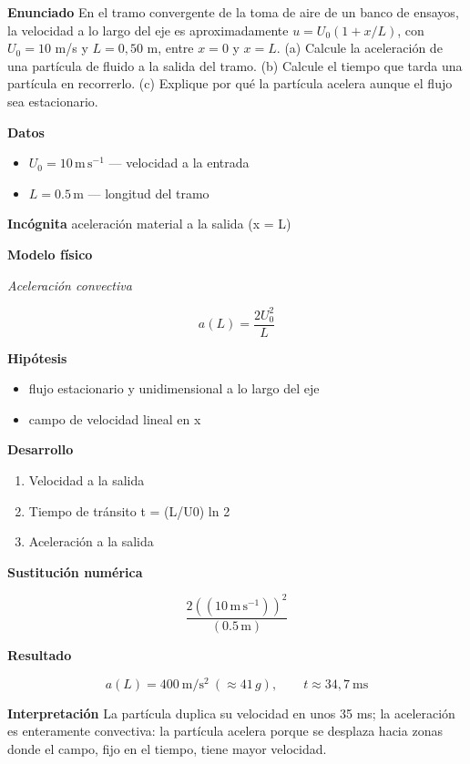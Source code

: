 \documentclass[10pt,openany]{book}
\begin{document}
\begin{tcolorbox}[title={Problema resuelto}, studiumworked, breakable]

\noindent\textbf{Enunciado}
En el tramo convergente de la toma de aire de un banco de ensayos, la velocidad a lo largo del eje es aproximadamente \(u = U_0(1 + x/L)\), con \(U_0 = 10\) m/s y \(L = 0{,}50\) m, entre \(x = 0\) y \(x = L\). (a) Calcule la aceleración de una partícula de fluido a la salida del tramo. (b) Calcule el tiempo que tarda una partícula en recorrerlo. (c) Explique por qué la partícula acelera aunque el flujo sea estacionario.

\noindent\textbf{Datos}
\begin{itemize}
\item $U_{0} = 10\,\mathrm{m}\,\mathrm{s}^{-1}$ — velocidad a la entrada
\item $L = 0.5\,\mathrm{m}$ — longitud del tramo
\end{itemize}

\noindent\textbf{Incógnita}
aceleración material a la salida (x = L)

\noindent\textbf{Modelo físico}

\noindent\textit{Aceleración convectiva}

\[
a(L) = \frac{2 U_0^{2}}{L}
\]

\noindent\textbf{Hipótesis}
\begin{itemize}
\item flujo estacionario y unidimensional a lo largo del eje
\item campo de velocidad lineal en x
\end{itemize}

\noindent\textbf{Desarrollo}
\begin{enumerate}
\item
Velocidad a la salida
\item
Tiempo de tránsito t = (L/U0) ln 2
\item
Aceleración a la salida
\end{enumerate}

\noindent\textbf{Sustitución numérica}

\[
\frac{2 \left(\left(10\,\mathrm{m}\,\mathrm{s}^{-1}\right)\right)^{2}}{\left(0.5\,\mathrm{m}\right)}
\]

\noindent\textbf{Resultado}

\[
a(L) = 400\ \mathrm{m/s^{2}}\ (\approx 41\,g),\qquad t \approx 34{,}7\ \mathrm{ms}
\]

\noindent\textbf{Interpretación}
La partícula duplica su velocidad en unos 35 ms; la aceleración es enteramente convectiva: la partícula acelera porque se desplaza hacia zonas donde el campo, fijo en el tiempo, tiene mayor velocidad.


\end{tcolorbox}
\end{document}
